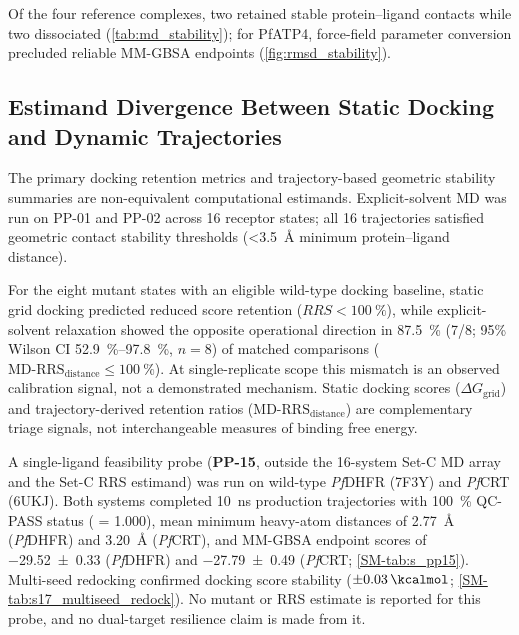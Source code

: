 \documentclass[journal=jcisd8,manuscript=article,layout=traditional]{achemso}
\begin{document}
Of the four reference complexes, two retained stable protein--ligand contacts while two dissociated (\cref{tab:md_stability}); for PfATP4, force-field parameter conversion precluded reliable MM-GBSA endpoints (\cref{fig:rmsd_stability}).



\subsection{Estimand Divergence Between Static Docking and Dynamic Trajectories}

The primary docking retention metrics and trajectory-based geometric stability summaries are non-equivalent computational estimands. Explicit-solvent MD was run on PP-01 and PP-02 across 16 receptor states; all 16 trajectories satisfied geometric contact stability thresholds (\qty{<3.5}{\angstrom} minimum protein--ligand distance).

For the eight mutant states with an eligible wild-type docking baseline, static grid docking predicted reduced score retention ($RRS < \qty{100}{\percent}$), while explicit-solvent relaxation showed the opposite operational direction in \qty{87.5}{\percent} (7/8; 95\% Wilson CI \qtyrange{52.9}{97.8}{\percent}, $n=\num{8}$) of matched comparisons ($\mathrm{MD\text{-}RRS}_{\mathrm{distance}} \le \qty{100}{\percent}$). At single-replicate scope this mismatch is an observed calibration signal, not a demonstrated mechanism. Static docking scores ($\Delta G_{\mathrm{grid}}$) and trajectory-derived retention ratios ($\mathrm{MD\text{-}RRS}_{\mathrm{distance}}$) are complementary triage signals, not interchangeable measures of binding free energy.

A single-ligand feasibility probe (\textbf{PP-15}, outside the 16-system Set-C MD array and the Set-C RRS estimand) was run on wild-type \textit{Pf}DHFR (7F3Y) and \textit{Pf}CRT (6UKJ). Both systems completed \qty{10}{\ns} production trajectories with \qty{100}{\percent} QC-PASS status ( = \num{1.000}), mean minimum heavy-atom distances of \qty{2.77}{\angstrom} (\textit{Pf}DHFR) and \qty{3.20}{\angstrom} (\textit{Pf}CRT), and MM-GBSA endpoint scores of \qty{-29.52 \pm 0.33}{\kcalmol} (\textit{Pf}DHFR) and \qty{-27.79 \pm 0.49}{\kcalmol} (\textit{Pf}CRT; \cref{SM-tab:s_pp15}). Multi-seed redocking confirmed docking score stability ($\pm\qty{0.03}{\kcalmol}$; \cref{SM-tab:s17_multiseed_redock}). No mutant or RRS estimate is reported for this probe, and no dual-target resilience claim is made from it.
\end{document}
